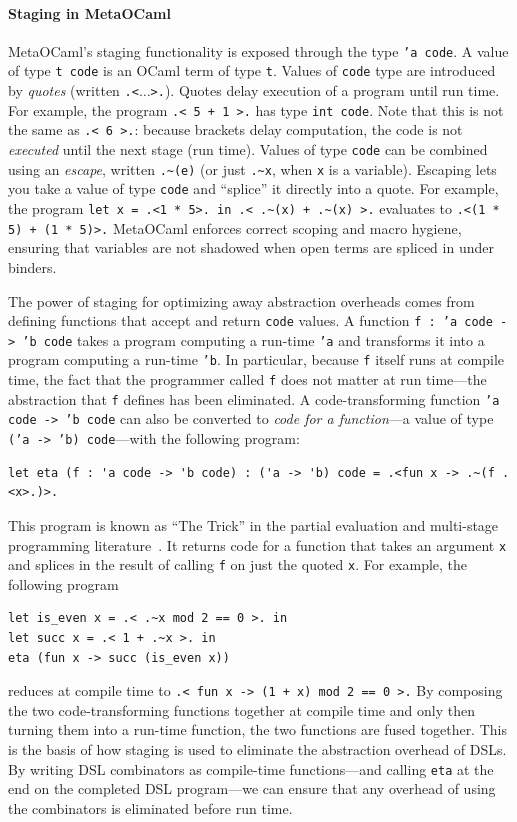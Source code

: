 \documentclass[acmsmall]{acmart}
\theoremstyle{definition}
\begin{document}
\paragraph{Staging in MetaOCaml}
MetaOCaml's staging functionality is exposed through the type \texttt{'a code}. A
value of type \texttt{t code} is an OCaml term
of type \texttt{t}.
Values of \texttt{code} type are introduced by \emph{quotes} (written
\texttt{.<$\ldots$>.}). Quotes delay execution of a program until run time. For
example, the program \texttt{.< 5 + 1 >.} has type \texttt{int code}.  Note that
this is not the same as \texttt{.< 6 >.}: because brackets delay computation,
the code is not \emph{executed} until the next stage (run time).
Values of type \texttt{code} can be combined using an \emph{escape},
written \texttt{.\~{}(e)} (or just \texttt{.\~{}x}, when \texttt{x} is a variable).  Escaping lets you take a value of type
\texttt{code} and ``splice'' it directly into a quote.  For example, the
program \texttt{let x = .<1 * 5>. in .< .\~{}(x) + .\~{}(x) >.} evaluates to
\texttt{.<(1 * 5) + (1 * 5)>.}  MetaOCaml enforces correct scoping and macro
hygiene, ensuring that variables are not shadowed when open terms are
spliced in under binders.

The power of staging for optimizing away abstraction overheads comes from
defining functions that accept and return \texttt{code} values.  A function
\texttt{f : 'a code -> 'b code} takes a program computing a
run-time \texttt{'a} and transforms it into a program computing a run-time
\texttt{'b}. In particular, because \texttt{f} itself runs at compile time, the
fact that the programmer called \texttt{f} does not matter at run time---the abstraction
that \texttt{f} defines has been eliminated.
A code-transforming function \texttt{'a code -> 'b code} can also be converted to \emph{code for a function}---a value of type
\texttt{('a -> 'b) code}---with the following program:
\begin{lstlisting}
let eta (f : 'a code -> 'b code) : ('a -> 'b) code = .<fun x -> .~(f .<x>.)>.
\end{lstlisting}

This program is known as ``The Trick'' in the partial evaluation and multi-stage programming literature~\cite{metaocamlimpl}.
It returns code for a function that takes an argument \texttt{x} and splices in the result of calling \texttt{f} on just
the quoted \texttt{x}.
%
For example, the following program
\begin{lstlisting}
let is_even x = .< .~x mod 2 == 0 >. in
let succ x = .< 1 + .~x >. in
eta (fun x -> succ (is_even x))
\end{lstlisting}
reduces at compile time to \texttt{.< fun x -> (1 + x) mod 2 == 0 >.}
%
By composing the two code-transforming functions together at compile time and only then turning them into a run-time function,
the two functions are fused together.
This is the basis of how staging is used to eliminate the abstraction overhead of DSLs.
By writing DSL combinators as compile-time functions---and calling \texttt{eta} at the end on the completed DSL program---we
can ensure that any overhead of using the combinators is eliminated before run time.
\end{document}
